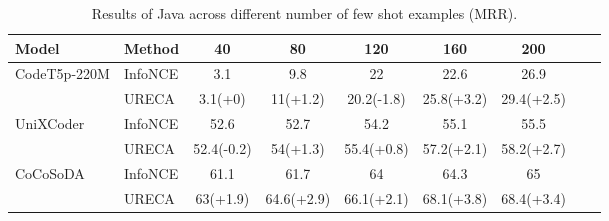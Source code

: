\begin{table*}[h]
\def\arraystretch{1.0}
\setlength\tabcolsep{8pt} %
\begin{tabular}{@{}lllcccccc@{}}

\toprule
Model                            & \multicolumn{1}{l}{Method}              & \multicolumn{1}{c}{40}           
& \multicolumn{1}{c}{80}         & \multicolumn{1}{c}{120}               & \multicolumn{1}{c}{160}     
& \multicolumn{1}{c}{200}        \\ \midrule

\multirow{2}{*}{CodeT5p-220M}      
& InfoNCE                   & \multicolumn{1}{c}{3.1}               & \multicolumn{1}{c}{9.8}          
                            & \multicolumn{1}{c}{22}                & \multicolumn{1}{c}{22.6}          
                            & \multicolumn{1}{c}{26.9}                    
                            \\ \cmidrule(l){2-7} 
& URECA                     & \multicolumn{1}{c}{3.1(+0)}         & \multicolumn{1}{c}{11(+1.2)}          
                            & \multicolumn{1}{c}{20.2(-1.8)}        & \multicolumn{1}{c}{25.8(+3.2)}          
                            & \multicolumn{1}{c}{29.4(+2.5)}                
                            \\ \midrule

\multirow{2}{*}{UniXCoder} 
& InfoNCE                   & \multicolumn{1}{c}{52.6}             & \multicolumn{1}{c}{52.7}          
                            & \multicolumn{1}{c}{54.2}             & \multicolumn{1}{c}{55.1}             
                            & \multicolumn{1}{c}{55.5}                   
                            \\ \cmidrule(l){2-7} 
& URECA                     & \multicolumn{1}{c}{52.4(-0.2)}          & \multicolumn{1}{c}{54(+1.3)}          
                            & \multicolumn{1}{c}{55.4(+0.8)}          & \multicolumn{1}{c}{57.2(+2.1)}          
                            & \multicolumn{1}{c}{58.2(+2.7)}                  
                            \\ \midrule

\multirow{2}{*}{CoCoSoDA} 
& InfoNCE                   & \multicolumn{1}{c}{61.1}          & \multicolumn{1}{c}{61.7}          
                            & \multicolumn{1}{c}{64}          & \multicolumn{1}{c}{64.3}          
                            & \multicolumn{1}{c}{65}                    
                            \\ \cmidrule(l){2-7} 
& URECA                     & \multicolumn{1}{c}{63(+1.9)}        & \multicolumn{1}{c}{64.6(+2.9)}          
                            & \multicolumn{1}{c}{66.1(+2.1)}          & \multicolumn{1}{c}{68.1(+3.8)}          
                            & \multicolumn{1}{c}{68.4(+3.4)}                   
                            \\ \bottomrule 
\end{tabular}
\caption{Results of Java across different number of few shot examples (MRR).}
\label{CSN_Java}
\end{table*}

